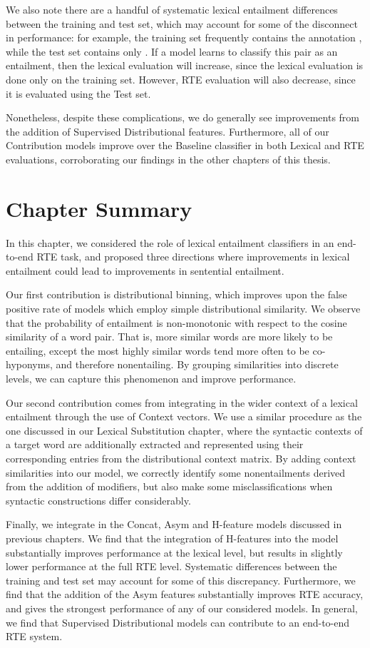 We also note there are a handful of systematic lexical entailment differences
between the training and test set, which may account for some of the disconnect
in performance: for example, the training set frequently contains the
annotation , while the test set contains only
. If a model learns to classify this pair as an
entailment, then the lexical evaluation will increase, since the lexical
evaluation is done only on the training set. However, RTE evaluation will also
decrease, since it is evaluated using the Test set.

Nonetheless, despite these complications, we do generally see improvements from
the addition of Supervised Distributional features. Furthermore, all of our
Contribution models improve over the Baseline classifier in both Lexical and
RTE evaluations, corroborating our findings in the other chapters of this
thesis.


\section{Chapter Summary}

In this chapter, we considered the role of lexical entailment classifiers in
an end-to-end RTE task, and proposed three directions where improvements in
lexical entailment could lead to improvements in sentential entailment.

Our first contribution is distributional binning, which improves upon the false
positive rate of models which employ simple distributional similarity. We observe
that the probability of entailment is non-monotonic with respect to the cosine
similarity of a word pair. That is, more similar words are more likely
to be entailing, except the most highly similar words tend more often to
be co-hyponyms, and therefore nonentailing. By grouping similarities into
discrete levels, we can capture this phenomenon and improve performance.

Our second contribution comes from integrating in the wider context of a
lexical entailment through the use of Context vectors. We use a similar
procedure as the one discussed in our Lexical Substitution chapter, where the
syntactic contexts of a target word are additionally extracted and represented
using their corresponding entries from the distributional context matrix.
By adding context similarities into our model, we correctly identify some
nonentailments derived from the addition of modifiers, but also make some
misclassifications when syntactic constructions differ considerably.

Finally, we integrate in the Concat, Asym and H-feature models discussed in
previous chapters. We find that the integration of H-features into the model
substantially improves performance at the lexical level, but results in
slightly lower performance at the full RTE level. Systematic differences
between the training and test set may account for some of this discrepancy.
Furthermore, we find that the addition of the Asym features substantially
improves RTE accuracy, and gives the strongest performance of any of our
considered models. In general, we find that Supervised Distributional models
can contribute to an end-to-end RTE system.

